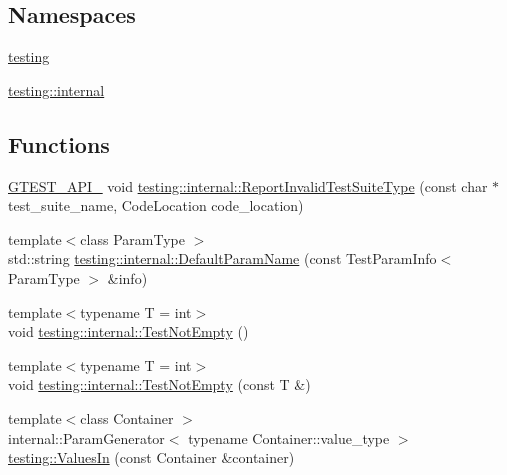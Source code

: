 \subsection*{Namespaces}
\begin{DoxyCompactItemize}
\item 
 \mbox{\hyperlink{namespacetesting}{testing}}
\item 
 \mbox{\hyperlink{namespacetesting_1_1internal}{testing\+::internal}}
\end{DoxyCompactItemize}
\subsection*{Functions}
\begin{DoxyCompactItemize}
\item 
\mbox{\hyperlink{_obj__test_2lib_2googletest-release-1_88_81_2googletest_2include_2gtest_2internal_2gtest-port_8h_aa73be6f0ba4a7456180a94904ce17790}{G\+T\+E\+S\+T\+\_\+\+A\+P\+I\+\_\+}} void \mbox{\hyperlink{namespacetesting_1_1internal_abbc0c3f8d5ee67a39d26167138effbe8}{testing\+::internal\+::\+Report\+Invalid\+Test\+Suite\+Type}} (const char $\ast$test\+\_\+suite\+\_\+name, Code\+Location code\+\_\+location)
\item 
{\footnotesize template$<$class Param\+Type $>$ }\\std\+::string \mbox{\hyperlink{namespacetesting_1_1internal_a954ec4a8a932dac7743e77e459ffefdc}{testing\+::internal\+::\+Default\+Param\+Name}} (const Test\+Param\+Info$<$ Param\+Type $>$ \&info)
\item 
{\footnotesize template$<$typename T  = int$>$ }\\void \mbox{\hyperlink{namespacetesting_1_1internal_aa07a04b597551a51d862911b22a94eb9}{testing\+::internal\+::\+Test\+Not\+Empty}} ()
\item 
{\footnotesize template$<$typename T  = int$>$ }\\void \mbox{\hyperlink{namespacetesting_1_1internal_ad2f14c6dc7d6c3d78884910943e11bc1}{testing\+::internal\+::\+Test\+Not\+Empty}} (const T \&)
\item 
{\footnotesize template$<$class Container $>$ }\\internal\+::\+Param\+Generator$<$ typename Container\+::value\+\_\+type $>$ \mbox{\hyperlink{namespacetesting_aa67d0c8470c5f69fcfcacc9e775fa982}{testing\+::\+Values\+In}} (const Container \&container)
\end{DoxyCompactItemize}
